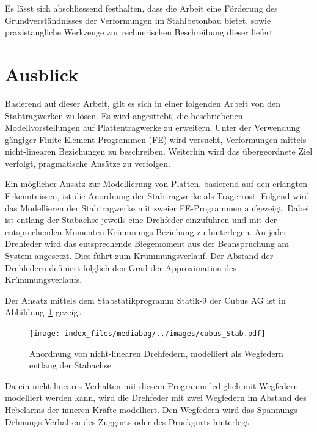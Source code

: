 \documentclass[
  12pt,
  letterpaper,
  egregdoesnotlikesansseriftitles]{scrreprt}
\begin{document}
Es lässt sich abschliessend festhalten, dass die Arbeit eine Förderung
des Grundverständnisses der Verformungen im Stahlbetonbau bietet, sowie
praxistaugliche Werkzeuge zur rechnerischen Beschreibung dieser liefert.

\hypertarget{ausblick}{%
\section{Ausblick}\label{ausblick}}

Basierend auf dieser Arbeit, gilt es sich in einer folgenden Arbeit von
den Stabtragwerken zu lösen. Es wird angestrebt, die beschriebenen
Modellvorstellungen auf Plattentragwerke zu erweitern. Unter der
Verwendung gängiger Finite-Element-Programmen (FE) wird versucht,
Verformungen mittels nicht-linearen Beziehungen zu beschreiben.
Weiterhin wird das übergeordnete Ziel verfolgt, pragmatische Ansätze zu
verfolgen.

Ein möglicher Ansatz zur Modellierung von Platten, basierend auf den
erlangten Erkenntnissen, ist die Anordnung der Stabtragwerke als
Trägerrost. Folgend wird das Modellieren der Stabtragwerke mit zweier
FE-Programmen aufgezeigt. Dabei ist entlang der Stabachse jeweils eine
Drehfeder einzuführen und mit der entsprechenden
Momenten-Krümmungs-Beziehung zu hinterlegen. An jeder Drehfeder wird das
entsprechende Biegemoment aus der Beanspruchung am System angesetzt.
Dies führt zum Krümmungsverlauf. Der Abstand der Drehfedern definiert
folglich den Grad der Approximation des Krümmungsverlaufs.

Der Ansatz mittels dem Stabstatikprogramm Statik-9 der Cubus AG ist in
Abbildung~\ref{fig-cubus_stab} gezeigt.

\begin{figure}[H]

{\centering \texttt{[image: index\_files/mediabag/../images/cubus\_Stab.pdf]}

}

\caption{\label{fig-cubus_stab}Anordnung von nicht-linearen Drehfedern,
modelliert als Wegfedern entlang der Stabachse}

\end{figure}

Da ein nicht-lineares Verhalten mit diesem Programm lediglich mit
Wegfedern modelliert werden kann, wird die Drehfeder mit zwei Wegfedern
im Abstand des Hebelarms der inneren Kräfte modelliert. Den Wegfedern
wird das Spannungs-Dehnungs-Verhalten des Zuggurts oder des Druckgurts
hinterlegt.
\end{document}
